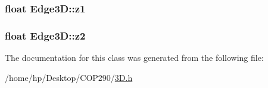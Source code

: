 \subsubsection[{\texorpdfstring{z1}{z1}}]{\setlength{\rightskip}{0pt plus 5cm}float Edge3\+D\+::z1}\hypertarget{class_edge3_d_a436d6f44e6fafe5a9e6dd571b91b89a3}{}\label{class_edge3_d_a436d6f44e6fafe5a9e6dd571b91b89a3}
\subsubsection[{\texorpdfstring{z2}{z2}}]{\setlength{\rightskip}{0pt plus 5cm}float Edge3\+D\+::z2}\hypertarget{class_edge3_d_a1e311241800a66f37b5e5a501da05e15}{}\label{class_edge3_d_a1e311241800a66f37b5e5a501da05e15}


The documentation for this class was generated from the following file\+:\begin{DoxyCompactItemize}
\item 
/home/hp/\+Desktop/\+C\+O\+P290/\hyperlink{3_d_8h}{3\+D.\+h}\end{DoxyCompactItemize}
